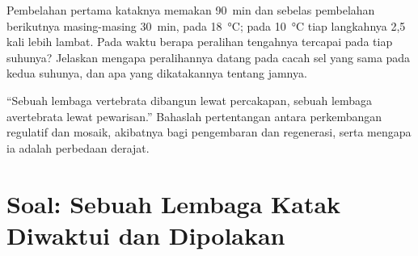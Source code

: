 \begin{exercise}[$\star\star\star$]\label{exo:b2:vertebrate-development:11}
Pembelahan pertama kataknya memakan \qty{90}{min} dan sebelas
pembelahan berikutnya masing-masing \qty{30}{min}, pada
\qty{18}{\celsius}; pada \qty{10}{\celsius} tiap langkahnya 2,5 kali
lebih lambat. Pada waktu berapa peralihan  tengahnya tercapai
pada tiap suhunya? Jelaskan mengapa peralihannya datang pada cacah sel
yang sama pada kedua suhunya, dan apa yang dikatakannya tentang jamnya.
\end{exercise}

\begin{exercise}[$\star\star\star$]\label{exo:b2:vertebrate-development:12}
``Sebuah lembaga vertebrata dibangun lewat percakapan, sebuah lembaga
avertebrata lewat pewarisan.'' Bahaslah pertentangan antara
perkembangan regulatif dan mosaik, akibatnya bagi pengembaran dan
regenerasi, serta mengapa ia adalah perbedaan derajat.
\end{exercise}

\section{Soal: Sebuah Lembaga Katak Diwaktui dan Dipolakan}

